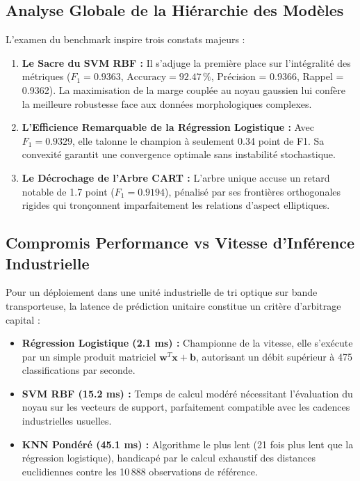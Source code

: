 \documentclass[10pt,a4paper,twocolumn]{article}
\begin{document}
\subsection{Analyse Globale de la Hiérarchie des Modèles}
L'examen du benchmark inspire trois constats majeurs :
\begin{enumerate}
    \item \textbf{Le Sacre du SVM RBF :} Il s'adjuge la première place sur l'intégralité des métriques ($F_1 = \mathbf{0.9363}$, $\text{Accuracy} = \mathbf{92.47\,\%}$, Précision = 0.9366, Rappel = 0.9362). La maximisation de la marge couplée au noyau gaussien lui confère la meilleure robustesse face aux données morphologiques complexes.
    \item \textbf{L'Efficience Remarquable de la Régression Logistique :} Avec $F_1 = 0.9329$, elle talonne le champion à seulement 0.34 point de F1. Sa convexité garantit une convergence optimale sans instabilité stochastique.
    \item \textbf{Le Décrochage de l'Arbre CART :} L'arbre unique accuse un retard notable de 1.7 point ($F_1 = 0.9194$), pénalisé par ses frontières orthogonales rigides qui tronçonnent imparfaitement les relations d'aspect elliptiques.
\end{enumerate}

\subsection{Compromis Performance vs Vitesse d'Inférence Industrielle}
Pour un déploiement dans une unité industrielle de tri optique sur bande transporteuse, la latence de prédiction unitaire constitue un critère d'arbitrage capital :
\begin{itemize}
    \item \textbf{Régression Logistique (2.1 ms) :} Championne de la vitesse, elle s'exécute par un simple produit matriciel $\mathbf{w}^T \mathbf{x} + \mathbf{b}$, autorisant un débit supérieur à 475 classifications par seconde.
    \item \textbf{SVM RBF (15.2 ms) :} Temps de calcul modéré nécessitant l'évaluation du noyau sur les vecteurs de support, parfaitement compatible avec les cadences industrielles usuelles.
    \item \textbf{KNN Pondéré (45.1 ms) :} Algorithme le plus lent (21 fois plus lent que la régression logistique), handicapé par le calcul exhaustif des distances euclidiennes contre les 10\,888 observations de référence.
\end{itemize}
\end{document}
